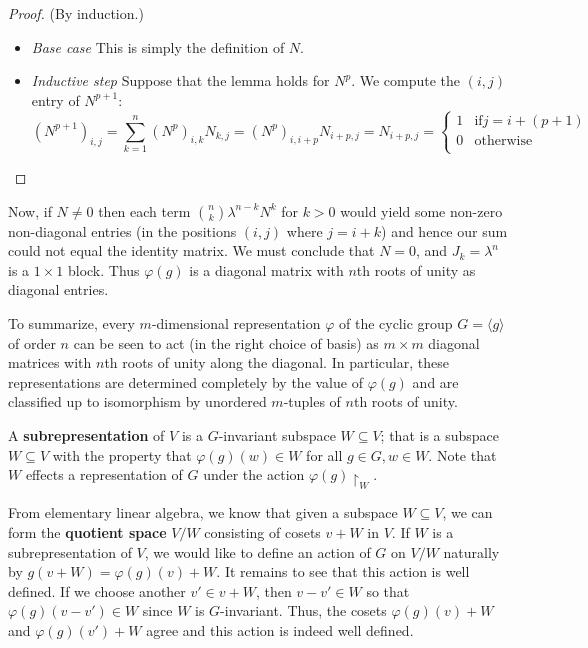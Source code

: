 \begin{example}
\begin{lemma}
\begin{proof}
(By induction.)
\begin{itemize}
\item \textit{Base case} This is simply the definition of $N$.
\item \textit{Inductive step} Suppose that the lemma holds for $N^p$.  We compute the $(i,j)$ entry of $N^{p+1}$:
\[ (N^{p+1})_{i,j} = \sum_{k=1}^{n} (N^{p})_{i,k} N_{k, j} = (N^p)_{i, i +p} N_{i +p, j} = N_{i +p, j} =\begin{cases} 
      1 & \text{if}  j = i + (p +1) \\
      0 & \text{otherwise} \\
   \end{cases}  \]
\end{itemize}
\end{proof}
\end{lemma}

Now, if $N \neq 0$ then each term $\binom {n}{k} \lambda ^ {n - k } N ^k$ for $k > 0$ would yield some non-zero non-diagonal entries (in the positions $(i,j)$ where $j= i + k$) and hence our sum could not equal the identity matrix.  We must conclude that $N = 0$, and $J_k = \lambda ^n$ is a $1 \times 1$ block.  Thus $\varphi(g)$ is a diagonal matrix with $n$th roots of unity as diagonal entries. 

To summarize, every $m$-dimensional representation $\varphi$ of the cyclic group $G = \langle g \rangle$ of order $n$ can be seen to act (in the right choice of basis) as $m \times m$ diagonal matrices with $n$th roots of unity along the diagonal.  In particular, these representations are determined completely by the value of $\varphi(g)$ and are classified up to isomorphism by unordered $m$-tuples of $n$th roots of unity.
\end{example}

\begin{defn} A \textbf{subrepresentation} of $V$ is a $G$-invariant subspace $W \subseteq V$; that is a subspace $W \subseteq V$ with the property that $\varphi(g) (w) \in W$ for all $g \in G, w \in W$.  Note that $W$ effects a representation of $G$ under the action $\varphi(g) \restriction_W$.
\end{defn}

From elementary linear algebra, we know that given a subspace $W \subseteq V$, we can form the \textbf{quotient space} $V / W$ consisting of cosets $v + W$ in $V$.  If $W$ is a subrepresentation of $V$, we would like to define an action of $G$ on $V / W$ naturally by $g (v + W) = \varphi(g)(v)+ W$.  It remains to see that this action is well defined.  If we choose another $v' \in v + W$, then $v - v' \in W$ so that $\varphi(g)(v - v') \in W$ since $W$ is $G$-invariant.  Thus, the cosets $\varphi(g)(v) + W$ and $\varphi(g)(v') + W$ agree and this action is indeed well defined.

